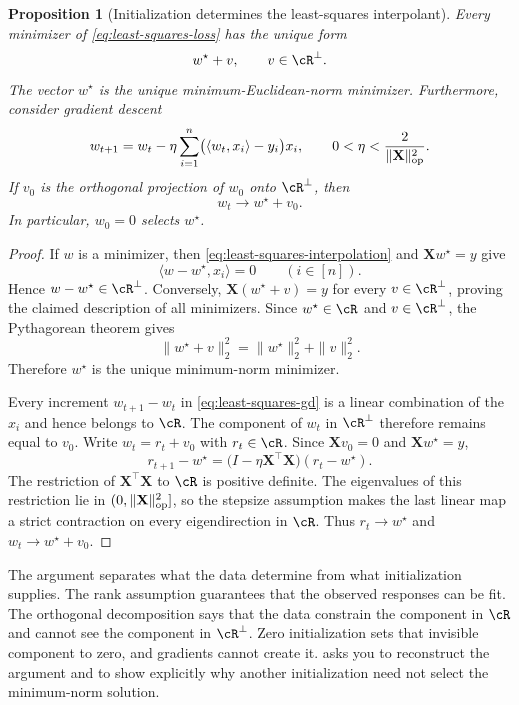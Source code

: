 \documentclass[11pt,twoside]{article}
\newtheorem{proposition}[theorem]{Proposition}
\theoremstyle{definition}
\theoremstyle{remark}
\begin{document}
\begin{proposition}[Initialization determines the least-squares interpolant]
\label{prop:ls-selection}
Every minimizer of \cref{eq:least-squares-loss} has the unique form
\[
 w^\star+v,
 \qquad v\in\cR^\perp.
\]
The vector $w^\star$ is the unique minimum-Euclidean-norm minimizer.
Furthermore, consider gradient descent
\begin{equation}
 w_{t+1}=w_t-
 \eta\sum_{i=1}^n
 \bigl(\langle w_t,x_i\rangle-y_i\bigr)x_i,
 \qquad
 0<\eta<\frac{2}{\|\mathbf X\|_{\rm op}^2}.
 \label{eq:least-squares-gd}
\end{equation}
If $v_0$ is the orthogonal projection of $w_0$ onto $\cR^\perp$, then
\[
 w_t\longrightarrow w^\star+v_0.
\]
In particular, $w_0=0$ selects $w^\star$.
\end{proposition}

\begin{proof}
If $w$ is a minimizer, then \cref{eq:least-squares-interpolation} and
$\mathbf Xw^\star=y$ give
\[
 \langle w-w^\star,x_i\rangle=0
 \qquad(i\in[n]).
\]
Hence $w-w^\star\in\cR^\perp$. Conversely,
$\mathbf X(w^\star+v)=y$ for every $v\in\cR^\perp$, proving the claimed
description of all minimizers. Since $w^\star\in\cR$ and
$v\in\cR^\perp$, the Pythagorean theorem gives
\[
 \|w^\star+v\|_2^2=\|w^\star\|_2^2+\|v\|_2^2.
\]
Therefore $w^\star$ is the unique minimum-norm minimizer.

Every increment $w_{t+1}-w_t$ in \cref{eq:least-squares-gd} is a linear
combination of the $x_i$ and hence belongs to $\cR$. The component of $w_t$ in
$\cR^\perp$ therefore remains equal to $v_0$. Write $w_t=r_t+v_0$ with
$r_t\in\cR$. Since $\mathbf Xv_0=0$ and $\mathbf Xw^\star=y$,
\[
 r_{t+1}-w^\star
 =\bigl(I-\eta\mathbf X^\top\mathbf X\bigr)(r_t-w^\star).
\]
The restriction of $\mathbf X^\top\mathbf X$ to $\cR$ is positive
definite. The eigenvalues of this restriction lie in
$(0,\|\mathbf X\|_{\rm op}^2]$, so the stepsize assumption makes the last
linear map a strict contraction on every eigendirection in $\cR$. Thus
$r_t\to w^\star$ and $w_t\to w^\star+v_0$.
\end{proof}

The argument separates what the data determine from what initialization
supplies. The rank assumption guarantees that the observed responses can be
fit. The orthogonal decomposition says that the data constrain the component
in $\cR$ and cannot see the component in $\cR^\perp$. Zero initialization
sets that invisible component to zero, and gradients cannot create it.
 asks you to reconstruct the argument
and to show explicitly why another initialization need not select the
minimum-norm solution.
\end{document}
